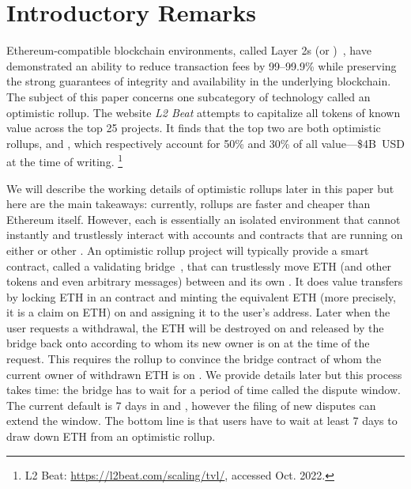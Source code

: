 \section{Introductory Remarks}

Ethereum-compatible blockchain environments, called Layer 2s (or \layertwos)~\cite{gudgeon2019sok}, have demonstrated an ability to reduce transaction fees by 99--99.9\% while preserving the strong guarantees of integrity and availability in the underlying blockchain. The subject of this paper concerns one subcategory of \layertwo technology called an optimistic rollup. The website \textit{L2 Beat} attempts to capitalize all tokens of known value across the top 25 \layertwo projects. It finds that the top two \layertwos are both optimistic rollups, \arb and \opt, which respectively account for 50\% and 30\% of all \layertwo value---\$4B~USD at the time of writing. \footnote{L2 Beat: \url{https://l2beat.com/scaling/tvl/}, accessed Oct. 2022.}

We will describe the working details of optimistic rollups later in this paper but here are the main takeaways: currently, rollups are faster and cheaper than Ethereum itself. However, each \layertwo is essentially an isolated environment that cannot instantly and trustlessly interact with accounts and contracts that are running on either \layerone or other \layertwos. An optimistic rollup project will typically provide a smart contract, called a validating bridge~\cite{mccorry2021sok}, that can trustlessly move ETH (and other tokens and even arbitrary messages) between \layerone and its own \layertwo. It does value transfers by locking ETH in an \layerone contract and minting the equivalent ETH (more precisely, it is a \layertwo claim on \layerone ETH) on \layertwo and assigning it to the user's \layertwo address. Later when the user requests a withdrawal, the ETH will be destroyed on \layertwo and released by the bridge back onto \layerone according to whom its new owner is on \layertwo at the time of the request. This requires the rollup to convince the \layerone bridge contract of whom the current owner of withdrawn ETH is on \layertwo. We provide details later but this process takes time: the bridge has to wait for a period of time called the dispute window. The current default is 7 days in \arb and \opt, however the filing of new disputes can extend the window. The bottom line is that users have to wait at least 7 days to draw down ETH from an optimistic rollup. 

